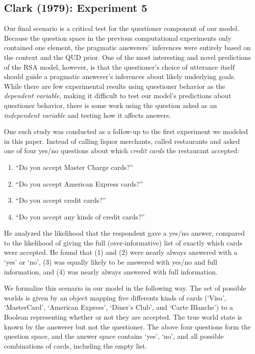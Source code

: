 \documentclass[12pt, floatsintext, man]{apa6}
\begin{document}
\subsection{Clark (1979): Experiment 5}
Our final scenario is a critical test for the questioner component of our model. Because the question space in the previous computational experiments only contained one element, the pragmatic answerers' inferences were entirely based on the context and the QUD prior. One of the most interesting and novel predictions of the RSA model, however, is that the questioner's choice of utterance itself should guide a pragmatic answerer's inferences about likely underlying goals. While there are few experimental results using questioner behavior as the \emph{dependent variable}, making it difficult to test our model's predictions about questioner behavior, there is some work using the question asked as an \emph{independent variable} and testing how it affects answers.

One such study was conducted as a follow-up to the first experiment we modeled in this paper. Instead of calling liquor merchants,  called restaurants and asked one of four yes/no questions about which \emph{credit cards} the restaurant accepted:

\begin{enumerate}
\item ``Do you accept Master Charge cards?'' 
\item ``Do you accept American Express cards?''
\item ``Do you accept credit cards?'' 
\item ``Do you accept any kinds of credit cards?'' 
\end{enumerate}

He analyzed the likelihood that the respondent gave a yes/no answer, compared to the likelihood of giving the full (over-informative) list of exactly which cards were accepted.  He found that (1) and (2) were nearly always answered with a `yes' or `no', (3) was equally likely to be answered with yes/no and full information, and (4) was nearly always answered with full information. 

We formalize this scenario in our model in the following way. The set of possible worlds is given by an object mapping five differents kinds of cards (`Visa', `MasterCard', `American Express', `Diner's Club', and `Carte Blanche') to a Boolean representing whether or not they are accepted. The true world state is known by the answerer but not the questioner. The above four questions form the question space, and the answer space contains `yes', `no', and all possible combinations of cards, including the empty list.
\end{document}
